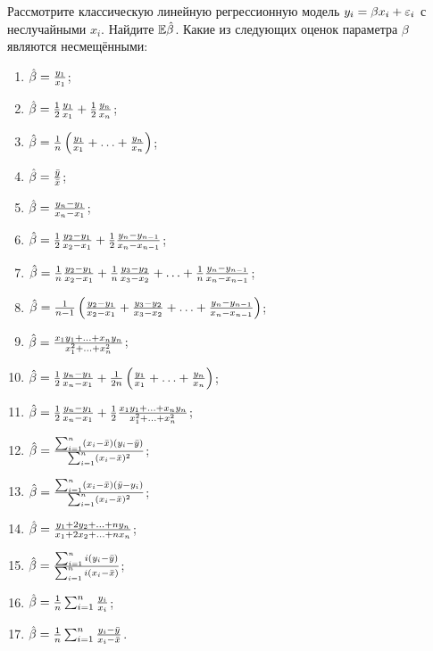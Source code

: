 \begin{problem}
Рассмотрите классическую линейную регрессионную модель $y_i = \beta x_i + \varepsilon_i$ с неслучайными $x_i$. 
Найдите $\mathbb{E} \hat{\beta}$. Какие из следующих оценок параметра $\beta$ являются несмещёнными:

\begin{enumerate}
\item $\hat{\beta} = \frac{y_1}{x_1}$;
\item $\hat{\beta} = \frac{1}{2} \frac{y_1}{x_1} + \frac{1}{2} \frac{y_n}{x_n}$;
\item $\hat{\beta} = \frac{1}{n} \left(  \frac{y_1}{x_1} + \ldots + \frac{y_n}{x_n} \right) $;
\item $\hat{\beta} = \frac{\bar{y}}{\bar{x}}$;
\item $\hat{\beta} = \frac{y_n - y_1}{x_n - x_1}$;
\item $\hat{\beta} = \frac{1}{2} \frac{y_2 - y_1}{x_2 - x_1} + \frac{1}{2} \frac{y_n - y_{n-1}}{x_n - x_{n-1}}$;
\item $\hat{\beta} = \frac{1}{n} \frac{y_2 - y_1}{x_2 - x_1} + \frac{1}{n} \frac{y_3 - y_2}{x_3 - x_2} + \ldots + \frac{1}{n} \frac{y_n - y_{n-1}}{x_n - x_{n-1}}$;
\item $\hat{\beta} = \frac{1}{n-1} \left( \frac{y_2 - y_1}{x_2 - x_1} + \frac{y_3 - y_2}{x_3 - x_2} + \ldots + \frac{y_n - y_{n-1}}{x_n - x_{n-1}} \right) $;
\item $\hat{\beta} = \frac{x_1 y_1 + \ldots + x_n y_n}{x_1^2 + \ldots + x_n^2}$;
\item $\hat{\beta} = \frac{1}{2} \frac{y_n - y_1}{x_n - x_1} + \frac{1}{2n}  \left( \frac{y_1}{x_1} + \ldots + \frac{y_n}{x_n} \right) $;
\item $\hat{\beta} =  \frac{1}{2} \frac{y_n - y_1}{x_n - x_1} + \frac{1}{2} \frac{x_1 y_1 + \ldots + x_n y_n}{x_1^2 + \ldots + x_n^2}$;
\item $\hat{\beta} = \frac{\sum_{i=1}^n (x_i - \bar{x})(y_i - \bar{y})}{\sum_{i=1}^n (x_i - \bar{x})^2}$;
\item $\hat{\beta} = \frac{\sum_{i=1}^n (x_i - \bar{x})(\bar{y} - y_i)}{\sum_{i=1}^n (x_i - \bar{x})^2}$;
\item $\hat{\beta} = \frac{y_1 + 2 y_2 + \ldots + n y_n}{x_1 + 2 x_2 + \ldots + n x_n}$;
\item $\hat{\beta} = \frac{\sum_{i=1}^n i(y_i - \bar{y})}{\sum_{i=1}^n i(x_i - \bar{x})}$;
\item $\hat{\beta} = \frac{1}{n} \sum_{i=1}^n \frac{y_i}{x_i}$;
\item $\hat{\beta} = \frac{1}{n} \sum_{i=1}^n \frac{y_i - \bar{y}}{x_i - \bar{x}}$.
\end{enumerate}



\end{problem}
